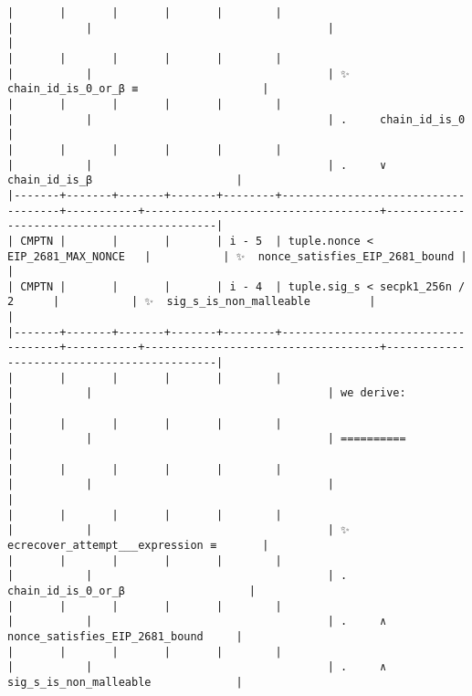 \documentclass[varwidth=\maxdimen,margin=0.5cm,multi={verbatim}]{standalone}
\begin{document}
\begin{verbatim}
|       |       |       |       |        |                                    |           |                                    |                                            |
|       |       |       |       |        |                                    |           |                                    | ✨  chain_id_is_0_or_β ≡                   |
|       |       |       |       |        |                                    |           |                                    | .     chain_id_is_0                        |
|       |       |       |       |        |                                    |           |                                    | .     ∨ chain_id_is_β                      |
|-------+-------+-------+-------+--------+------------------------------------+-----------+------------------------------------+--------------------------------------------|
| CMPTN |       |       |       | i - 5  | tuple.nonce < EIP_2681_MAX_NONCE   |           | ✨  nonce_satisfies_EIP_2681_bound |                                            |
| CMPTN |       |       |       | i - 4  | tuple.sig_s < secpk1_256n / 2      |           | ✨  sig_s_is_non_malleable         |                                            |
|-------+-------+-------+-------+--------+------------------------------------+-----------+------------------------------------+--------------------------------------------|
|       |       |       |       |        |                                    |           |                                    | we derive:                                 |
|       |       |       |       |        |                                    |           |                                    | ==========                                 |
|       |       |       |       |        |                                    |           |                                    |                                            |
|       |       |       |       |        |                                    |           |                                    | ✨  ecrecover_attempt___expression ≡       |
|       |       |       |       |        |                                    |           |                                    | .     chain_id_is_0_or_β                   |
|       |       |       |       |        |                                    |           |                                    | .     ∧ nonce_satisfies_EIP_2681_bound     |
|       |       |       |       |        |                                    |           |                                    | .     ∧ sig_s_is_non_malleable             |

\end{verbatim}
\end{document}
